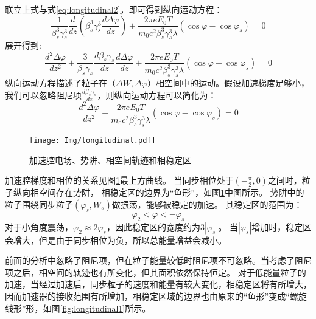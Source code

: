 联立上式与式\ref{eq:longitudinal2}，即可得到纵向运动方程：
\begin{equation}
    \label{eq:longitudinal_equation}
        \frac{1}{\beta_s^3 \gamma_s^3} \frac{d}{dz}\left(\beta_s^3 \gamma_s^3 \frac{d\Delta \varphi}{dz}\right)
        +\frac{2\pi e E_0 T}{m_0 c^2 \beta_s^3 \gamma_s^3 \lambda} (\cos {\varphi} - \cos {\varphi}_s)
        =0
\end{equation}
展开得到:
\begin{equation}
    \label{eq:longitudinal_equation2}
        \frac{d^2 \Delta \varphi}{dz^2}
        +\frac{3}{\beta_s \gamma_s} \frac{d\beta_s \gamma_s}{dz} \frac{d\Delta \varphi}{dz}
        +\frac{2\pi e E_0 T}{m_0 c^2 \beta_s^3 \gamma_s^3 \lambda} (\cos {\varphi} - \cos {\varphi}_s)
        =0
\end{equation}
纵向运动方程描述了粒子在（$\Delta W , \Delta \varphi$）相空间中的运动。假设加速梯度足够小，我们可以忽略阻尼项$\frac{d\beta_s \gamma_s}{dz}$，则纵向运动方程可以简化为：
\begin{equation}
    \label{eq:longitudinal_equation2_concise}
        \frac{d^2 \Delta \varphi}{dz^2}
        +\frac{2\pi e E_0 T}{m_0 c^2 \beta_s^3 \gamma_s^3 \lambda} (\cos {\varphi} - \cos {\varphi}_s)
        =0
\end{equation}

\begin{figure}[!htb]
    \centering
    \texttt{[image: Img/longitudinal.pdf]}
    \caption{加速腔电场、势阱、相空间轨迹和相稳定区}
    \label{fig:longitudinal}
\end{figure}

加速腔梯度和相位的关系见图\ref{fig:longitudinal}最上方曲线。
当同步相位处于$(-\frac{\pi}{2},0)$之间时，粒子纵向相空间存在势阱，
相稳定区的边界为“鱼形”，如图\ref{fig:longitudinal}中图所示。
势阱中的粒子围绕同步粒子$(\varphi_s,W_s)$做振荡，能够被稳定的加速。
其稳定区的范围为：
\begin{equation}
    \label{eq:longitudinal_phi}
        \varphi_2 < \varphi < -\varphi_s
\end{equation}
对于小角度震荡，$\varphi_2 \approx 2\varphi_s$，因此稳定区的宽度约为$3|\varphi_s|$。
当$|\varphi_s|$增加时，稳定区会增大，但是由于同步相位为负，所以总能量增益会减小。

前面的分析中忽略了阻尼项，但在粒子能量较低时阻尼项不可忽略。当考虑了阻尼项之后，相空间的轨迹也有所变化，但其面积依然保持恒定。
对于低能量粒子的加速，当经过加速后，同步粒子的速度和能量有较大变化，相稳定区将有所增大，
因而加速器的接收范围有所增加，相稳定区域的边界也由原来的“鱼形”变成“螺旋线形”形，如图\ref{fig:longitudinal1}所示。

